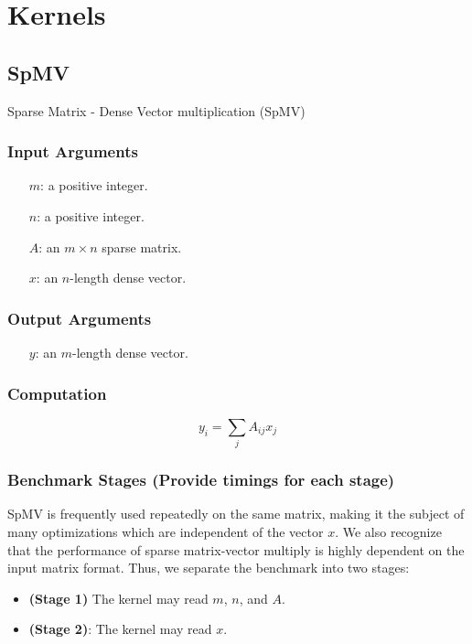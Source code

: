 \documentclass{article}
\begin{document}
\section{Kernels}

\subsection{SpMV}
Sparse Matrix - Dense Vector multiplication (SpMV)
\subsubsection{Input Arguments}

\begin{itemize}
	\item[$m$:] a positive integer.
	\item[$n$:] a positive integer.
	\item[$A$:] an $m \times n$ sparse matrix.
	\item[$x$:] an $n$-length dense vector.
\end{itemize}

\subsubsection{Output Arguments}

\begin{itemize}
	\item[$y$:] an $m$-length dense vector.
\end{itemize}

\subsubsection{Computation}

$$y_i = \sum_{j}A_{ij}x_j$$

\subsubsection{Benchmark Stages (Provide timings for each stage)}

SpMV is frequently used repeatedly on the same matrix, making it the
subject of many optimizations which are independent of the vector $x$.  We also recognize that the performance of sparse matrix-vector multiply is highly dependent on the input matrix format. Thus, 
we separate the benchmark into two stages:

\begin{itemize}
\item \textbf{(Stage 1)}
	The kernel may read $m$, $n$, and $A$.
\item \textbf{(Stage 2)}:
	The kernel may read $x$.
\end{itemize}
\end{document}
